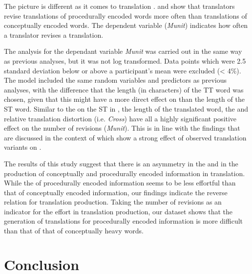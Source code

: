 \documentclass[output=paper]{LSP/langsci}
\begin{document}
The picture is different as it comes to translation .  and  show that translators revise translations of procedurally encoded words more often than translations of conceptually encoded words. The dependent variable
(\textit{Munit}) indicates how often a translator revises a translation. 




The analysis for the dependant variable \textit{Munit} was carried out in the same way as previous analyses, but it was not log transformed. Data points which were 2.5 standard deviation below or above a participant's mean were excluded ({\textless} 4\%). The model included the same random variables and predictors as previous analyses, with the difference that the length (in characters) of the TT word was chosen, given that this might have a more direct effect on  than the length of the ST word. Similar to the  on the ST in , the length of the translated word, the  and relative translation distortion (i.e. \textit{Cross}) have all a highly significant positive effect on the number of revisions (\textit{Munit}). This is in line with the findings that are discussed in the context of  which show a strong effect of observed translation variants on . 


The results of this study suggest that there is an asymmetry in the  and in the production of conceptually and procedurally encoded information in translation. While the  of procedurally encoded information seems to be less effortful than that of conceptually encoded information, our findings indicate the reverse relation for translation production. Taking the number of revisions as an indicator for the effort in translation production, our dataset shows that the generation of translations for procedurally encoded information is more difficult than that of that of conceptually heavy words. 


\section{Conclusion}
\label{carl-schaeffer:sec:5}
\end{document}
